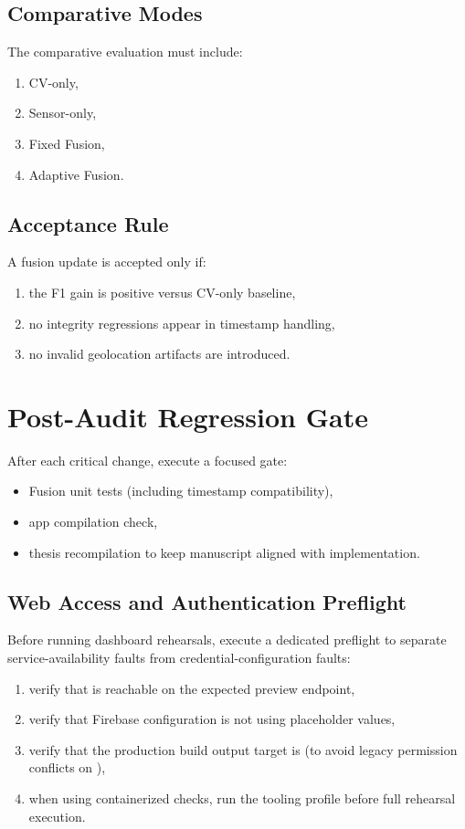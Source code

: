 \subsection{Comparative Modes}
The comparative evaluation must include:
\begin{enumerate}
    \item CV-only,
    \item Sensor-only,
    \item Fixed Fusion,
    \item Adaptive Fusion.
\end{enumerate}

\subsection{Acceptance Rule}
A fusion update is accepted only if:
\begin{enumerate}
    \item the F1 gain is positive versus CV-only baseline,
    \item no integrity regressions appear in timestamp handling,
    \item no invalid geolocation artifacts are introduced.
\end{enumerate}

\section{Post-Audit Regression Gate}
After each critical change, execute a focused gate:
\begin{itemize}
    \item Fusion unit tests (including timestamp compatibility),
    \item app compilation check,
    \item thesis recompilation to keep manuscript aligned with implementation.
\end{itemize}

\subsection{Web Access and Authentication Preflight}
Before running dashboard rehearsals, execute a dedicated preflight to separate
service-availability faults from credential-configuration faults:
\begin{enumerate}
    \item verify that  is reachable on the expected preview endpoint,
    \item verify that Firebase configuration is not using placeholder values,
    \item verify that the production build output target is  (to avoid legacy permission conflicts on ),
    \item when using containerized checks, run the tooling profile before full rehearsal execution.
\end{enumerate}

